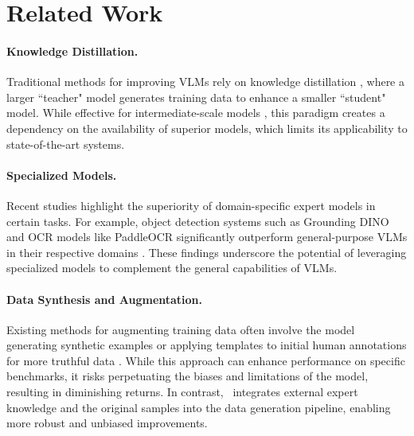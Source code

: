 \section{Related Work}
\paragraph{Knowledge Distillation.} Traditional methods for improving VLMs rely on knowledge distillation \citep{wang2022self}, where a larger ``teacher" model generates training data to enhance a smaller ``student" model. While effective for intermediate-scale models \citep{haotian2023visual, fuxiao2023mitigating}, this paradigm creates a dependency on the availability of superior models, which limits its applicability to state-of-the-art systems. %

\paragraph{Specialized Models.}Recent studies \cite{fei2024multimodal} highlight the superiority of domain-specific expert models in certain tasks. For example, object detection systems such as Grounding DINO and OCR models like PaddleOCR \cite{paddleocr} significantly outperform general-purpose VLMs in their respective domains \citep{lu2021florence, tianhe2024grounded, shilong2023grounding}. These findings underscore the potential of leveraging specialized models to complement the general capabilities of VLMs.
\vspace{-2mm}
\paragraph{Data Synthesis and Augmentation.} Existing methods for augmenting training data often involve the model generating synthetic examples \citep{fuxiao2023mitigating, chen2023sharegpt4v} or applying templates to initial human annotations for more truthful data \citep{chiu2024megacoinenhancingmediumgrainedcolor, chiu2024colorsensestudycolorvision}. While this approach can enhance performance on specific benchmarks, it risks perpetuating the biases and limitations of the model, resulting in diminishing returns. In contrast, \aide~integrates external expert knowledge and the original samples into the data generation pipeline, enabling more robust and unbiased improvements.



\vspace{-2mm}